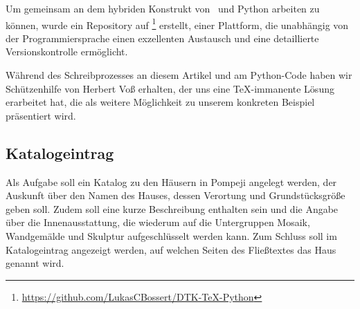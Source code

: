\documentclass[ngerman]{dtk}
\begin{document}
Um gemeinsam an dem hybriden Konstrukt von \XeLaTeX\ und Python arbeiten zu können, wurde ein Repository auf \footnote{\url{https://github.com/LukasCBossert/DTK-TeX-Python}} erstellt, einer Plattform,  
die unabhängig von der Programmiersprache einen exzellenten Austausch und eine detaillierte Versionskontrolle ermöglicht.

Während des Schreibprozesses an diesem Artikel und am Python-Code haben wir Schützenhilfe von Herbert Voß erhalten, 
der uns eine \TeX -immanente Lösung erarbeitet hat, 
die  als weitere Möglichkeit zu unserem konkreten Beispiel präsentiert wird.

\subsection{Katalogeintrag}
Als Aufgabe soll ein Katalog zu den Häusern in Pompeji angelegt werden,
der Auskunft über den Namen des Hauses, dessen Verortung und Grundstücksgröße  geben soll.
Zudem soll eine kurze Beschreibung enthalten sein und die Angabe über die Innenausstattung, 
die wiederum auf die Untergruppen Mosaik, Wandgemälde und Skulptur aufgeschlüsselt werden kann. 
Zum Schluss soll im Katalogeintrag angezeigt werden, 
auf welchen Seiten des Fließtextes das Haus genannt wird.
\end{document}
